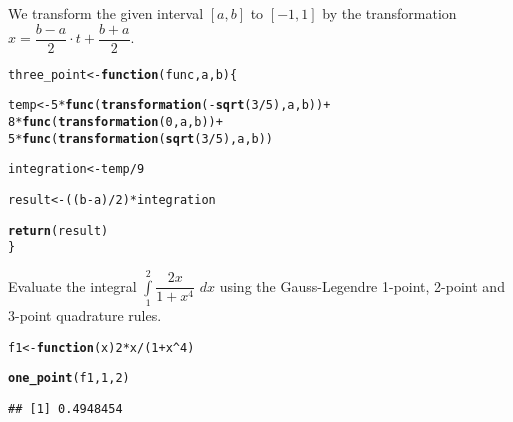 \documentclass[11pt, a4paper]{article}\usepackage[]{graphicx}\usepackage[]{xcolor}
\makeatletter
\newcommand{\hlnum}[1]{\textcolor[rgb]{0.686,0.059,0.569}{#1}}%
\newcommand{\hlopt}[1]{\textcolor[rgb]{0,0,0}{#1}}%
\newcommand{\hldef}[1]{\textcolor[rgb]{0.345,0.345,0.345}{#1}}%
\newcommand{\hlkwa}[1]{\textcolor[rgb]{0.161,0.373,0.58}{\textbf{#1}}}%
\newcommand{\hlkwb}[1]{\textcolor[rgb]{0.69,0.353,0.396}{#1}}%
\newcommand{\hlkwc}[1]{\textcolor[rgb]{0.333,0.667,0.333}{#1}}%
\newcommand{\hlkwd}[1]{\textcolor[rgb]{0.737,0.353,0.396}{\textbf{#1}}}%
\newenvironment{kframe}{%
 \def\at@end@of@kframe{}%
 \ifinner\ifhmode%
  \def\at@end@of@kframe{\end{minipage}}%
  \begin{minipage}{\columnwidth}%
 \fi\fi%
 \def\FrameCommand##1{\hskip\@totalleftmargin \hskip-\fboxsep
 \colorbox{shadecolor}{##1}\hskip-\fboxsep
     \hskip-\linewidth \hskip-\@totalleftmargin \hskip\columnwidth}%
 \MakeFramed {\advance\hsize-\width
   \@totalleftmargin\z@ \linewidth\hsize
   \@setminipage}}%
 {\par\unskip\endMakeFramed%
 \at@end@of@kframe}
\newenvironment{knitrout}{}{} %
\makeatother
\begin{document}
We transform the given interval $\left[ a, b \right]$ to $\left[ -1, 1 \right]$ by the transformation $x = \dfrac{b - a}{2} \cdot t + \dfrac{b + a}{2}$.

\begin{knitrout}
\color{fgcolor}\begin{kframe}
\begin{alltt}
\hldef{three_point} \hlkwb{<-} \hlkwa{function}\hldef{(}\hlkwc{func}\hldef{,} \hlkwc{a}\hldef{,} \hlkwc{b}\hldef{)\{}

  \hldef{temp} \hlkwb{<-} \hlnum{5} \hlopt{*} \hlkwd{func}\hldef{(}\hlkwd{transformation}\hldef{(}\hlopt{-}\hlkwd{sqrt}\hldef{(}\hlnum{3}\hlopt{/}\hlnum{5}\hldef{), a, b))} \hlopt{+}
                 \hlnum{8} \hlopt{*} \hlkwd{func}\hldef{(}\hlkwd{transformation}\hldef{(}\hlnum{0}\hldef{, a, b))} \hlopt{+}
                 \hlnum{5} \hlopt{*} \hlkwd{func}\hldef{(}\hlkwd{transformation}\hldef{(}\hlkwd{sqrt}\hldef{(}\hlnum{3}\hlopt{/}\hlnum{5}\hldef{), a, b))}

  \hldef{integration} \hlkwb{<-} \hldef{temp} \hlopt{/} \hlnum{9}

  \hldef{result} \hlkwb{<-} \hldef{( (b} \hlopt{-} \hldef{a)} \hlopt{/} \hlnum{2} \hldef{)} \hlopt{*} \hldef{integration}

  \hlkwd{return}\hldef{(result)}
\hldef{\}}
\end{alltt}
\end{kframe}
\end{knitrout}

\leftpointright \hspace{0.5cm} Evaluate the integral $\displaystyle{\int \limits_{1}^{2} \dfrac{2x}{1 + x^4} \,\, dx}$ using the Gauss-Legendre 1-point, 2-point and 3-point quadrature rules.

\begin{knitrout}
\color{fgcolor}\begin{kframe}
\begin{alltt}
\hldef{f1} \hlkwb{<-} \hlkwa{function}\hldef{(}\hlkwc{x}\hldef{)} \hlnum{2}\hlopt{*}\hldef{x} \hlopt{/} \hldef{(}\hlnum{1} \hlopt{+} \hldef{x}\hlopt{^}\hlnum{4}\hldef{)}

\hlkwd{one_point}\hldef{(f1,} \hlnum{1}\hldef{,} \hlnum{2}\hldef{)}
\end{alltt}
\begin{verbatim}
## [1] 0.4948454
\end{verbatim}
\end{kframe}
\end{knitrout}
\end{document}
